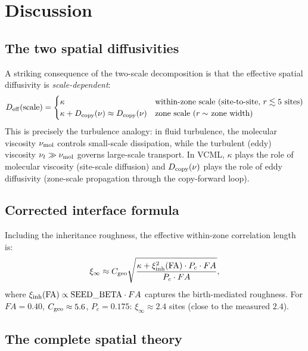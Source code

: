 \documentclass[11pt]{article}
\begin{document}
\section{Discussion}

\subsection{The two spatial diffusivities}

A striking consequence of the two-scale decomposition is that the
effective spatial diffusivity is \emph{scale-dependent}:
\begin{equation}
  D_{\rm eff}({\rm scale}) =
  \begin{cases}
    \kappa & \text{within-zone scale (site-to-site, $r \lesssim 5$ sites)}\\
    \kappa + D_{\rm copy}(\nu) \approx D_{\rm copy}(\nu) & \text{zone scale ($r \sim$ zone width)}
  \end{cases}
\end{equation}
This is precisely the turbulence analogy: in fluid turbulence, the molecular
viscosity $\nu_{\rm mol}$ controls small-scale dissipation,
while the turbulent (eddy) viscosity $\nu_t \gg \nu_{\rm mol}$ governs
large-scale transport.
In VCML, $\kappa$ plays the role of molecular viscosity (site-scale diffusion)
and $D_{\rm copy}(\nu)$ plays the role of eddy diffusivity (zone-scale propagation
through the copy-forward loop).

\subsection{Corrected interface formula}

Including the inheritance roughness, the effective within-zone correlation
length is:
\begin{equation}
  \xi_\infty \approx C_{\rm geo}
  \sqrt{\frac{\kappa + \xi_{\rm inh}^2(\mathrm{FA})\cdot P_c\cdot FA}
             {P_c\cdot FA}},
\end{equation}
where $\xi_{\rm inh}(\mathrm{FA}) \propto \mathrm{SEED\_BETA}\cdot FA$
captures the birth-mediated roughness.
For $FA=0.40$, $C_{\rm geo}\approx 5.6$, $P_c=0.175$:
$\xi_\infty \approx 2.4$ sites (close to the measured $2.4$).

\subsection{The complete spatial theory}
\end{document}
